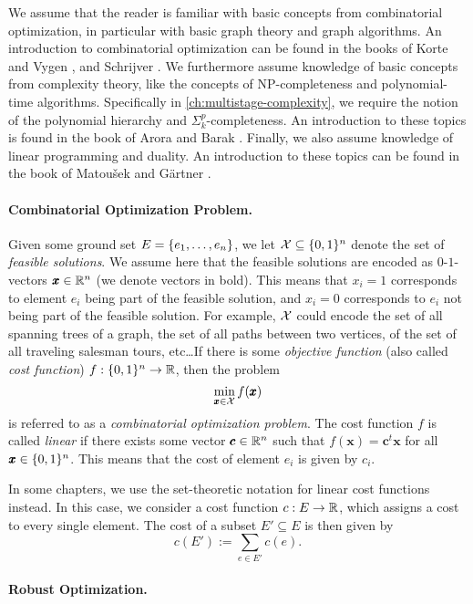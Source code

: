 We assume that the reader is familiar with basic concepts from combinatorial optimization, in particular with basic graph theory and graph algorithms. An introduction to combinatorial optimization can be found in the books of Korte and Vygen \cite{korte2006combinatorial}, and Schrijver \cite{schrijver2003combinatorial}. We furthermore assume knowledge of basic concepts from complexity theory, like the concepts of NP-completeness and polynomial-time algorithms. Specifically in \cref{ch:multistage-complexity}, we require the notion of the polynomial hierarchy and $\Sigma^p_k$-completeness. An introduction to these topics is found in the book of Arora and Barak \cite{arora2009computational}. Finally, we also assume knowledge of linear programming and duality. An introduction to these topics can be found in the book of Matou{\v{s}}ek and Gärtner \cite{matouvsek2007understanding}.

\paragraph*{Combinatorial Optimization Problem.}
Given some ground set $E = \{ e_1, \ldots, e_n \}$, we let $\mathcal{X} \subseteq \{ 0,1 \}^n$ denote the set of \emph{feasible solutions}. 
We assume here that the feasible solutions are encoded as $0$-$1$-vectors $\pmb x \in \mathbb{R}^n$ (we denote vectors in bold). This means that $x_i = 1$ corresponds to element $e_i$ being part of the feasible solution, and $x_i=0$ corresponds to $e_i$ not being part of the feasible solution. 
For example, $\mathcal{X}$ could encode the set of all spanning trees of a graph, the set of all paths between two vertices, of the set of all traveling salesman tours, etc\dots If there is some \emph{objective function} (also called \emph{cost function}) $f : \{ 0,1 \}^n \to \mathbb{R}$, then the problem
\[
\min_{\pmb x \in \mathcal{X}} f(\pmb x)
\]
is referred to as a \emph{combinatorial optimization problem}. The cost function $f$ is called \emph{linear} if there exists some vector $\pmb c \in \mathbb{R}^n$ such that $f(\pmb x) = \pmb c^t \pmb x$ for all $\pmb x \in \{ 0,1 \}^n$. This means that the cost of element $e_i$ is given by $c_i$.

In some chapters, we use the set-theoretic notation for linear cost functions instead. In this case, we consider a cost function $c : E \to \mathbb{R}$, which assigns a cost to every single element. The cost of a subset $E' \subseteq E$ is then given by
\[ c(E') := \sum_{e \in E'}c(e). \]



\paragraph*{Robust Optimization.}

